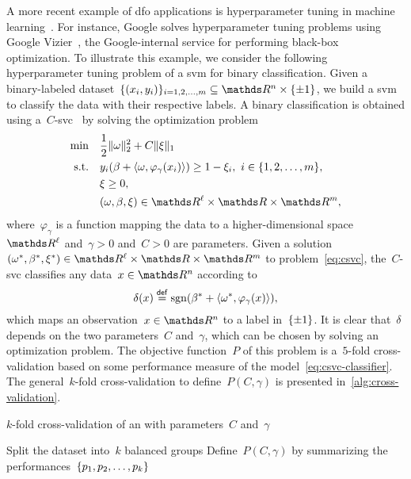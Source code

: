A more recent example of \gls{dfo} applications is hyperparameter tuning in machine learning~\cite{Ghanbari_Scheinberg_2017}.
For instance, Google solves hyperparameter tuning problems using Google Vizier~\cite{Golovin_Etal_2017}, the Google-internal service for performing black-box optimization.
To illustrate this example, we consider the following hyperparameter tuning problem of a \gls{svm} for binary classification.
Given a binary-labeled dataset~$\set{(x_i, y_i)}_{i = 1, 2, \dots, m} \subseteq \R^n \times \set{\pm 1}$, we build a \gls{svm} to classify the data with their respective labels.
A binary classification is obtained using a~$C$-\gls{svc}~\cite{Chang_Lin_2011} by solving the optimization problem
\begin{subequations}
    \label{eq:csvc}
    \begin{align}
        \min        & \quad \frac{1}{2} \norm{\omega}_2^2 + C \norm{\xi}_1\\
        \text{s.t.} & \quad y_i (\beta + \inner{\omega, \varphi_{\gamma}(x_i)}) \ge 1 - \xi_i, ~ i \in \set{1, 2, \dots, m},\\
                    & \quad \xi \ge 0,\\
                    & \quad (\omega, \beta, \xi) \in \R^{\ell} \times \R \times \R^m,
    \end{align}
\end{subequations}
where~$\varphi_{\gamma}$ is a function mapping the data to a higher-dimensional space~$\R^{\ell}$ and~$\gamma > 0$ and~$C > 0$ are parameters.
Given a solution~$(\omega^{\ast}, \beta^{\ast}, \xi^{\ast}) \in \R^{\ell} \times \R \times \R^m$ to problem~\cref{eq:csvc}, the~$C$-\gls{svc} classifies any data~$x \in \R^n$ according to
\begin{equation}
    \label{eq:csvc-classifier}
    \delta(x) \mathrel{\stackrel{\mathsf{def}}{=}} \operatorname{sgn}(\beta^{\ast} + \langle\omega^{\ast}, \varphi_{\gamma}(x)\rangle),
\end{equation}
which maps an observation~$x \in \R^n$ to a label in~$\{\pm 1\}$.
It is clear that~$\delta$ depends on the two parameters~$C$ and~$\gamma$, which can be chosen by solving an optimization problem.
The objective function~$P$ of this problem is a~$5$-fold cross-validation based on some performance measure of the model~\cref{eq:csvc-classifier}.
The general~$k$-fold cross-validation to define~$P(C, \gamma)$ is presented in~\cref{alg:cross-validation}.

\begin{algorithm}[ht]
    \caption{$k$-fold cross-validation of an  with parameters~$C$ and~$\gamma$}
    \label{alg:cross-validation}
    \DontPrintSemicolon
    Split the dataset into~$k$ balanced groups\;
    Define~$P(C, \gamma)$ by summarizing the performances~$\{p_1, p_2, \dots, p_k\}$\;
\end{algorithm}

